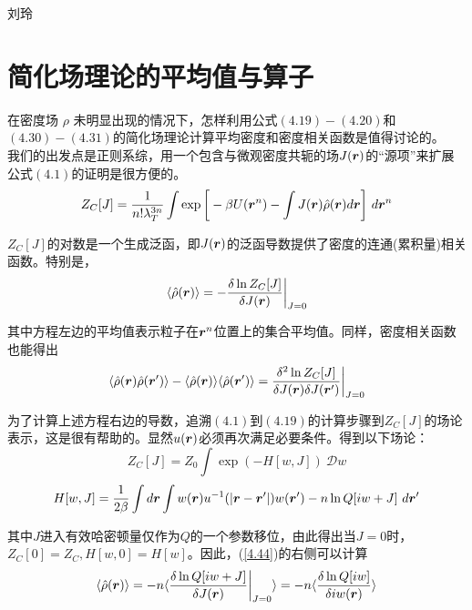 
\begin{center}
刘玲
\end{center}

\section{简化场理论的平均值与算子}

在密度场 $\rho $ 未明显出现的情况下，怎样利用公式$(4.19)-(4.20)$和$(4.30)-(4.31)$的简化场理论计算平均密度和密度相关函数是值得讨论的。\\

我们的出发点是正则系综，用一个包含与微观密度共轭的场$J(\bm{r})$的“源项”来扩展公式$(4.1)$的证明是很方便的。\\
\begin{equation}
Z_{C}[J]=\frac{1}{n! \lambda _{T}^{3n}} \int  \exp \bigg[-\beta U(\bm{r}^{n})- \int J(\bm{r}) \hat{ \rho }(\bm{r})d\bm{r} \bigg]~ d \bm{r}^{n}
\end{equation}

$Z_{C}[J]$的对数是一个生成泛函，即$J(\bm{r})$的泛函导数提供了密度的连通(累积量)相关函数。特别是，\\
\begin{equation}
\langle \hat{ \rho } (\bm{r}) \rangle = - \frac{\delta \ln Z_{C}[J] }{\delta J(\bm{r})} \bigg |_{J=0}
\label{4.44}
\end{equation}

其中方程左边的平均值表示粒子在$\bm{r}^{n}$位置上的集合平均值。同样，密度相关函数也能得出\\
\begin{equation}
\langle \hat{ \rho } (\bm{r}) \hat{ \rho } (\bm{r}')\rangle - \langle  \hat{ \rho } (\bm{r}) \rangle \langle  \hat{ \rho } (\bm{r}') \rangle = \frac{\delta ^{2} \ln Z_{C}[J]}{\delta J(\bm{r}) \delta J(\bm{r}')} \bigg |_{J=0}
\end{equation}

为了计算上述方程右边的导数，追溯$(4.1)$到$(4.19)$的计算步骤到$Z_{C}[J]$的场论表示，这是很有帮助的。显然$u(\bm{r})$必须再次满足必要条件。得到以下场论：\\
\begin{equation}
Z_{C}[J]=Z_{0} \int \exp (-H[w,J]) ~\mathcal{D} w 
\end{equation}
\begin{equation}
H[w ,J]=\frac{1}{2 \beta } \int d\bm{r} \int w (\bm{r}) u^{-1} (|\bm{r}-\bm{r}'|) w (\bm{r}') - n \ln Q[i w +J] ~d\bm{r}'
\end{equation}

其中$J$进入有效哈密顿量仅作为$Q$的一个参数移位，由此得出当$J=0$时，$Z_{C}[0]=Z_{C},H[ w,0]=H[ w ]$。因此，(\ref{4.44})的右侧可以计算\\
\begin{equation}
\langle \hat{ \rho } (\bm{r}) \rangle = - n \langle \frac{ \delta \ln Q[i w + J ]}{ \delta J(\bm{r}) } \bigg|_{J=0} \rangle = -n \langle \frac{\delta \ln Q[ i w]}{ \delta i w (\bm{r})} \rangle
\label{4.48}
\end{equation}

